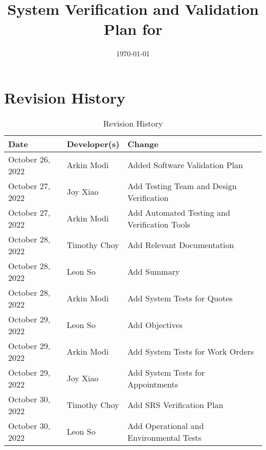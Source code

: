 \documentclass[12pt, titlepage]{article}
\begin{document}
\title{System Verification and Validation Plan for \progname{}}
\author{\authname}
\date{\today}

\maketitle


\section{Revision History}

\begin{longtable}{p{} p{} p{}}
	\caption{Revision History} \label{TblRevisionHistory}                                                  \\
	\toprule
	\textbf{Date}    & \textbf{Developer(s)} & \textbf{Change}                                             \\
	\midrule
	October 26, 2022 & Arkin Modi            & Added Software Validation Plan                              \\
	October 27, 2022 & Joy Xiao              & Add Testing Team and Design Verification                    \\
	October 27, 2022 & Arkin Modi            & Add Automated Testing and Verification Tools                \\
	October 28, 2022 & Timothy Choy          & Add Relevant Documentation                                  \\
	October 28, 2022 & Leon So               & Add Summary                                                 \\
	October 28, 2022 & Arkin Modi            & Add System Tests for Quotes                                 \\
	October 29, 2022 & Leon So               & Add Objectives                                              \\
	October 29, 2022 & Arkin Modi            & Add System Tests for Work Orders                            \\
	October 29, 2022 & Joy Xiao              & Add System Tests for Appointments                           \\
	October 30, 2022 & Timothy Choy          & Add SRS Verification Plan                                   \\
	October 30, 2022 & Leon So               & Add Operational and Environmental Tests                     \\

\end{longtable}
\end{document}
